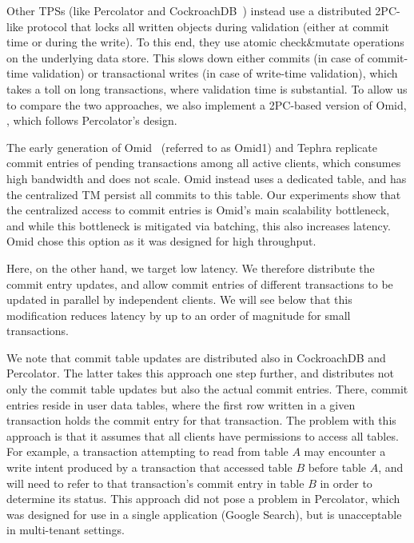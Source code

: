 Other TPSs (like Percolator and  CockroachDB~\cite{cockroach}) instead use a distributed 2PC-like protocol that locks all written objects during validation (either at commit time or during the write). To this end, they use atomic check\&mutate operations on the underlying data store. This slows down either commits (in case of commit-time validation) or transactional writes (in case of write-time validation), which takes a toll on long transactions, where validation time is substantial. 
%
To allow us to compare the two approaches, we also implement a 2PC-based version of Omid, \syspc,
which follows Percolator's design.

%
The early generation of Omid~\cite{OmidICDE2014} (referred to as Omid1) and Tephra replicate commit entries 
of pending transactions among all active clients, which consumes high bandwidth and does not scale. Omid 
instead uses a dedicated table, and 
has the centralized TM persist all commits to this table. 
Our experiments show that the centralized access to commit entries is Omid's main scalability bottleneck, 
and while this bottleneck is mitigated via batching, this also increases latency.
Omid chose this  option as it was designed for high throughput. 

Here, on the other hand, we target  low latency. 
We therefore distribute the commit entry updates, and allow commit entries of different transactions to be 
updated in parallel by independent clients. We will see below that this modification reduces latency
by up to an order of magnitude for small transactions.

We note that commit table updates are distributed also in CockroachDB and Percolator. 
The latter takes this approach one step further, and distributes not only the commit table updates 
but also the actual commit entries. There, commit entries reside in user data tables, 
where the first row written in a given transaction holds the commit entry for that transaction.
The problem with this approach is that it assumes that all clients have permissions to access all 
tables. For example, a transaction attempting to read from  table $A$ may encounter a write intent 
produced by a transaction that accessed table $B$ before table $A$, and will need to refer to 
that transaction's commit entry in table $B$ in order to determine its status. This approach 
did not pose a problem in Percolator, which was designed for use in a single application (Google Search), 
but is unacceptable in multi-tenant settings.   


